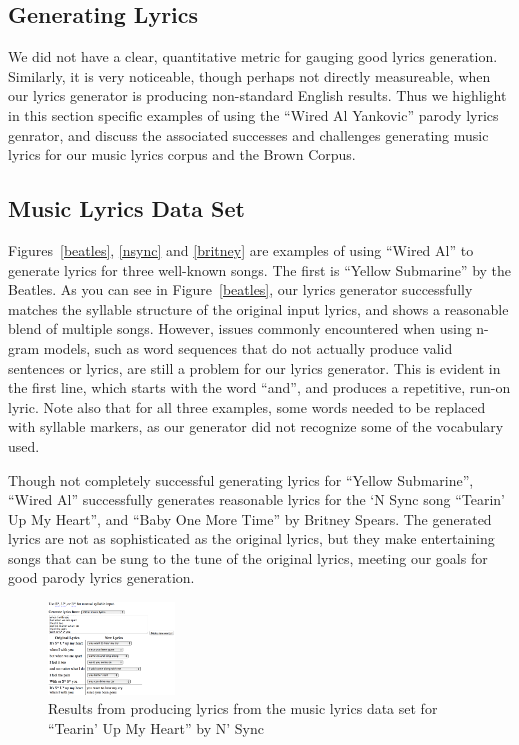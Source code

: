 \documentclass{vgtc}                          %
\begin{document}

\subsection{Generating Lyrics}
We did not have a clear, quantitative metric for gauging good lyrics
generation. Similarly, it is very noticeable, though perhaps not directly
measureable, when our lyrics generator is producing non-standard
English results. Thus we highlight in this section specific examples
of using the ``Wired Al Yankovic'' parody
lyrics genrator, and discuss the associated successes and
challenges generating music lyrics for our music lyrics corpus
and the Brown Corpus.

\subsection{Music Lyrics Data Set}
Figures~\ref{beatles}, \ref{nsync} and \ref{britney}
are examples of using ``Wired Al'' to generate lyrics for
three well-known songs. The first is
``Yellow Submarine'' by the Beatles. As you can see in
Figure~\ref{beatles}, our lyrics generator successfully
matches the syllable structure of the original input lyrics,
and shows a reasonable blend of multiple songs. However,
issues commonly encountered when using n-gram models,
such as word sequences that do not actually produce
valid sentences or lyrics, are still a problem
for our lyrics generator. This is evident in the
first line, which starts with the word ``and'',
and produces a repetitive, run-on lyric. Note also that for
all three examples, some words needed to be replaced with
syllable markers, as our generator did not recognize
some of the vocabulary used.

Though not completely successful generating lyrics for
``Yellow Submarine'', ``Wired Al'' successfully generates
reasonable lyrics for the `N Sync song ``Tearin' Up My
Heart'', and ``Baby One More Time'' by Britney Spears.
The generated lyrics are not as sophisticated as the
original lyrics, but they make entertaining songs
that can be sung to the tune of the original lyrics,
meeting our goals for good parody lyrics generation.

\begin{figure}[t]
\centering
\includegraphics[width=0.3\textwidth]{images/png/tumh3.png}
\caption{Results from producing lyrics from the music lyrics data set for ``Tearin' Up My Heart'' by
N' Sync}
\label{fig:nsync}
\end{figure}
\end{document}
